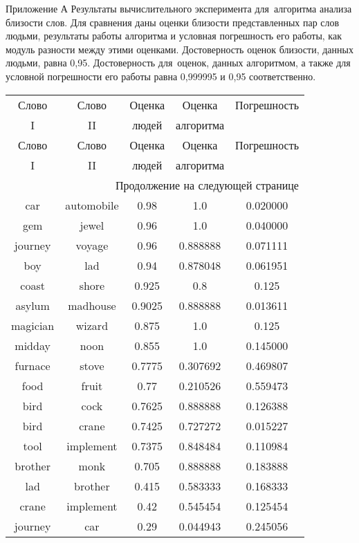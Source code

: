 Приложение А
Результаты вычислительного эксперимента для~алгоритма анализа 
близости слов.
Для сравнения даны оценки близости представленных пар слов людьми, 
результаты работы алгоритма и условная погрешность его работы, как модуль разности между этими оценками.
Достоверность оценок близости, данных людьми, равна 0,95. Достоверность для~оценок,
данных алгоритмом, а также для условной погрешности его работы равна 0,999995 и 0,95 соответственно. 
\begin{center}
{\Large
\begin{longtable}{|c|c|c|c|c|}
\hline
Слово & Слово & Оценка & Оценка & Погрешность  \\
I & II & людей & алгоритма &  \\
\hline\endfirsthead
\hline
Слово & Слово & Оценка & Оценка & Погрешность  \\
I & II & людей & алгоритма &  \\
\hline\endhead
\hline \multicolumn{5}{|r|}{{Продолжение на следующей странице}} \\ \hline
\endfoot
\endlastfoot
car & automobile & 0.98 & 1.0 & 0.020000 \\
\hline
gem & jewel & 0.96 & 1.0 & 0.040000 \\
\hline
journey & voyage & 0.96 & 0.888888 & 0.071111 \\
\hline
boy & lad & 0.94 & 0.878048 & 0.061951 \\
\hline
coast & shore & 0.925 & 0.8 & 0.125 \\
\hline
asylum & madhouse & 0.9025 & 0.888888 & 0.013611 \\
\hline
magician & wizard & 0.875 & 1.0 & 0.125 \\
\hline
midday & noon & 0.855 & 1.0 & 0.145000 \\
\hline
furnace & stove & 0.7775 & 0.307692 & 0.469807 \\
\hline
food & fruit & 0.77 & 0.210526 & 0.559473 \\
\hline
bird & cock & 0.7625 & 0.888888 & 0.126388 \\
\hline
bird & crane & 0.7425 & 0.727272 & 0.015227 \\
\hline
tool & implement & 0.7375 & 0.848484 & 0.110984 \\
\hline
brother & monk & 0.705 & 0.888888 & 0.183888 \\
\hline
lad & brother & 0.415 & 0.583333 & 0.168333 \\
\hline
crane & implement & 0.42 & 0.545454 & 0.125454 \\
\hline
journey & car & 0.29 & 0.044943 & 0.245056 \\

\end{longtable}}
\end{center}
